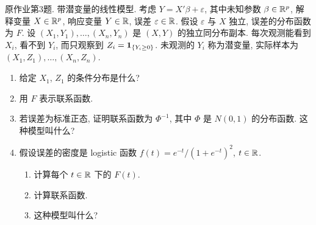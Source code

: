 \begin{exercise}\label{ps11:p03}
原作业第3题. 带潜变量的线性模型.
考虑 $Y=X'\beta+\varepsilon$, 其中未知参数 $\beta\in\mathbb R^p$, 解释变量 $X\in\mathbb R^p$, 响应变量 $Y\in\mathbb R$, 误差 $\varepsilon\in\mathbb R$. 假设 $\varepsilon$ 与 $X$ 独立, 误差的分布函数为 $F$. 设 $(X_1,Y_1),\ldots,(X_n,Y_n)$ 是 $(X,Y)$ 的独立同分布副本. 每次观测能看到 $X_i$, 看不到 $Y_i$, 而只观察到 $Z_i=\mathbf 1_{\{Y_i\ge0\}}$. 未观测的 $Y_i$ 称为潜变量, 实际样本为 $(X_1,Z_1),\ldots,(X_n,Z_n)$.
\begin{enumerate}[label=\arabic*.]
\item 给定 $X_1$, $Z_1$ 的条件分布是什么?
\item 用 $F$ 表示联系函数.
\item 若误差为标准正态, 证明联系函数为 $\Phi^{-1}$, 其中 $\Phi$ 是 $N(0,1)$ 的分布函数. 这种模型叫什么?
\item 假设误差的密度是 logistic 函数 $f(t)=e^{-t}/(1+e^{-t})^2$, $t\in\mathbb R$.
\begin{enumerate}[label=\alph*)]
\item 计算每个 $t\in\mathbb R$ 下的 $F(t)$.
\item 计算联系函数.
\item 这种模型叫什么?
\end{enumerate}
\end{enumerate}
\end{exercise}
